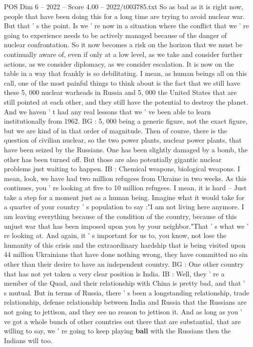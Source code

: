 \begin{textsample}{POS Dim 6 – 2022 – Score 4.00 – 2022/t003785.txt}
So as bad as it is right now, people that have been doing this for a long time are trying to avoid nuclear war.
But that ' s the point.
Is we ' re now in a situation where the conflict that we ' re going to experience needs to be actively managed because of the danger of nuclear confrontation.
So it now becomes a risk on the horizon that we must be continually aware of, even if only at a low level, as we take and consider further actions, as we consider diplomacy, as we consider escalation.
It is now on the table in a way that frankly is so debilitating.
I mean, as human beings all on this call, one of the most painful things to think about is the fact that we still have these 5, 000 nuclear warheads in Russia and 5, 000 the United States that are still pointed at each other, and they still have the potential to destroy the planet.
And we haven ' t had any real lessons that we ' ve been able to learn institutionally from 1962.
BG : 5, 000 being a generic figure, not the exact figure, but we are kind of in that order of magnitude.
Then of course, there is the question of civilian nuclear, so the two power plants, nuclear power plants, that have been seized by the Russians.
One has been slightly damaged by a bomb, the other has been turned off.
But those are also potentially gigantic nuclear problems just waiting to happen.
IB : Chemical weapons, biological weapons.
I mean, look, we have had two million refugees from Ukraine in two weeks.
As this continues, you ' re looking at five to 10 million refugees.
I mean, it is hard -- Just take a step for a moment just as a human being.
Imagine what it would take for a quarter of your country ' s population to say :"I am not living here anymore.
I am leaving everything because of the condition of the country, because of this unjust war that has been imposed upon you by your neighbor."That ' s what we ' re looking at.
And again, it ' s important for us to, you know, not lose the humanity of this crisis and the extraordinary hardship that is being visited upon 44 million Ukrainians that have done nothing wrong, they have committed no sin other than their desire to have an independent country.
BG : One other country that has not yet taken a very clear position is India.
IB : Well, they ' re a member of the Quad, and their relationship with China is pretty bad, and that ' s mutual.
But in terms of Russia, there ' s been a longstanding relationship, trade relationship, defense relationship between India and Russia that the Russians are not going to jettison, and they see no reason to jettison it.
And as long as you ' ve got a whole bunch of other countries out there that are substantial, that are willing to say, we ' re going to keep playing \textbf{ball} with the Russians then the Indians will too.

\end{textsample}
